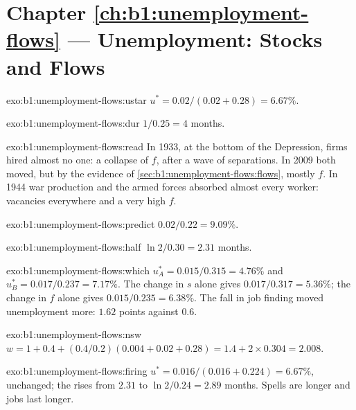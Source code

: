 \section*{Chapter \ref{ch:b1:unemployment-flows} --- Unemployment: Stocks and Flows}

\begin{solution}{exo:b1:unemployment-flows:ustar}
$u^* = 0.02/(0.02 + 0.28) = 6.67\%$.
\end{solution}

\begin{solution}{exo:b1:unemployment-flows:dur}
$1/0.25 = 4$ months.
\end{solution}

\begin{solution}{exo:b1:unemployment-flows:read}
In 1933, at the bottom of the Depression, firms hired almost no one: a
collapse of $f$, after a wave of separations. In 2009 both moved, but by the
evidence of \cref{sec:b1:unemployment-flows:flows}, mostly $f$. In 1944 war
production and the armed forces absorbed almost every worker: vacancies
everywhere and a very high $f$.
\end{solution}

\begin{solution}{exo:b1:unemployment-flows:predict}
$0.02/0.22 = 9.09\%$.
\end{solution}

\begin{solution}{exo:b1:unemployment-flows:half}
$\ln 2/0.30 = 2.31$ months.
\end{solution}

\begin{solution}{exo:b1:unemployment-flows:which}
$u^*_A = 0.015/0.315 = 4.76\%$ and $u^*_B = 0.017/0.237 = 7.17\%$. The change in $s$ alone gives
$0.017/0.317 = 5.36\%$; the change in $f$ alone gives $0.015/0.235 = 6.38\%$. The fall in job
finding moved unemployment more: $1.62$ points against $0.6$.
\end{solution}

\begin{solution}{exo:b1:unemployment-flows:nsw}
$w = 1 + 0.4 + (0.4/0.2)(0.004 + 0.02 + 0.28) = 1.4 + 2 \times 0.304 = 2.008$.
\end{solution}

\begin{solution}{exo:b1:unemployment-flows:firing}
$u^* = 0.016/(0.016 + 0.224) = 6.67\%$, unchanged; the  rises from $2.31$ to
$\ln 2/0.24 = 2.89$ months. Spells are longer and jobs last longer.
\end{solution}


